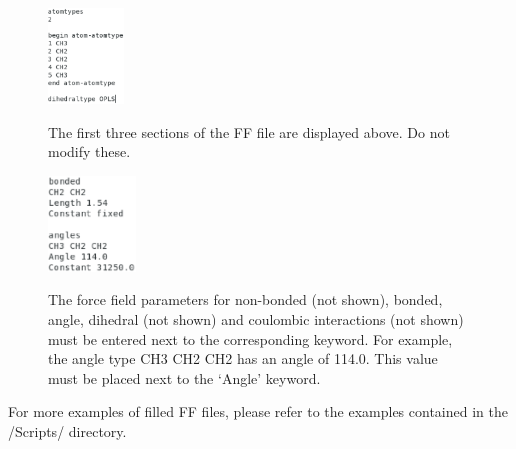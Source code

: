 \documentclass{beamer}
\begin{document}
\begin{frame}
\begin{figure}
\begin{center}
\includegraphics[height=1in]{top_ff.eps}
\end{center}
The first three sections of the FF file are displayed above. Do not modify these.
\end{figure}

\end{frame}
\begin{frame}
\begin{figure}
\begin{center}
\includegraphics[height=1in]{body_ff.eps}
\end{center}
The force field parameters for non-bonded (not shown), bonded, angle, dihedral (not shown) and coulombic interactions (not shown) must be entered next to the corresponding keyword. For example, the angle type CH3 CH2 CH2 has an angle of 114.0. This value must be placed next to the `Angle' keyword.
\end{figure}

\end{frame}


\begin{frame}
For more examples of filled FF files, please refer to the examples contained in the /Scripts/ directory.
\end{frame}
\end{document}
